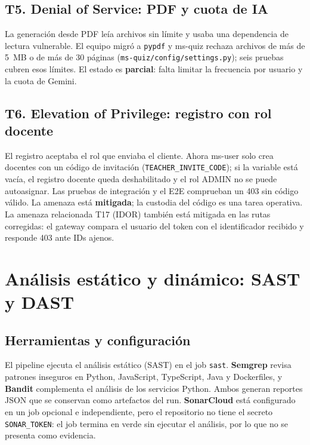 \documentclass[12pt,a4paper]{article}
\DeclareRobustCommand{\ruta}[1]{\nolinkurl{#1}}
\begin{document}
\subsection{T5. Denial of Service: PDF y cuota de IA}

La generación desde PDF leía archivos sin límite y usaba una dependencia de lectura vulnerable. El
equipo migró a \texttt{pypdf} y ms-quiz rechaza archivos de más de 5~MB o de más de 30 páginas
(\ruta{ms-quiz/config/settings.py}); seis pruebas cubren esos límites. El estado es
\textbf{parcial}: falta limitar la frecuencia por usuario y la cuota de Gemini.

\subsection{T6. Elevation of Privilege: registro con rol docente}

El registro aceptaba el rol que enviaba el cliente. Ahora ms-user solo crea docentes con un código
de invitación (\texttt{TEACHER\_INVITE\_CODE}); si la variable está vacía, el registro docente queda
deshabilitado y el rol ADMIN no se puede autoasignar. Las pruebas de integración y el E2E comprueban
un 403 sin código válido. La amenaza está \textbf{mitigada}; la custodia del código es una tarea
operativa. La amenaza relacionada T17 (IDOR) también está mitigada en las rutas corregidas: el
gateway compara el usuario del token con el identificador recibido y responde 403 ante IDs ajenos.

\section{Análisis estático y dinámico: SAST y DAST}
\label{sec:sast-dast}

\subsection{Herramientas y configuración}

El pipeline ejecuta el análisis estático (SAST) en el job \texttt{sast}. \textbf{Semgrep} revisa
patrones inseguros en Python, JavaScript, TypeScript, Java y Dockerfiles, y \textbf{Bandit}
complementa el análisis de los servicios Python. Ambos generan reportes JSON que se conservan como
artefactos del run. \textbf{SonarCloud} está configurado en un job opcional e independiente, pero el
repositorio no tiene el secreto \texttt{SONAR\_TOKEN}: el job termina en verde sin ejecutar el
análisis, por lo que no se presenta como evidencia.
\end{document}
